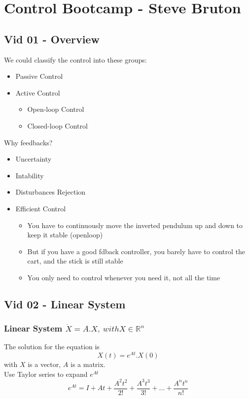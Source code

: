 
\section{Control Bootcamp - Steve Bruton}

\subsection{Vid 01 - Overview}

We could classify the control into these groups:
\begin{itemize}
  \item Passive Control
  \item Active Control
    \begin{itemize}
      \item Open-loop Control
      \item Closed-loop Control
    \end{itemize}
\end{itemize} 
Why feedbacks?
\begin{itemize}
  \item Uncertainty
  \item Intability
  \item Disturbances Rejection
  \item Efficient Control
    \begin{itemize}
      \item You have to continuously move the inverted pendulum up and down to keep it stable (openloop)
      \item But if you have a good fdback controller, you barely have to control the cart, and the stick is still stable
      \item You only need to control whenever you need it, not all the time
    \end{itemize}
\end{itemize}

\subsection{Vid 02 - Linear System} 
\subsubsection{Linear System $ \dot{X} = A.X, ~with X \in\mathbb{R}^{n} $}


The solution for the equation is 
\begin{equation}
  X(t) = e^{At}.X(0)
\end{equation}
with $X$ is a vector, $A$ is a matrix.
\\Use Taylor series to expand $e^{At}$ 
\begin{equation}
  e^{At} = I + At + \frac{ A^{2}t^{2} }{2!} + \frac{ A^{3}t^{3} }{3!} + \ldots + \frac{ A^{n}t^{n} }{n!}
\end{equation}

